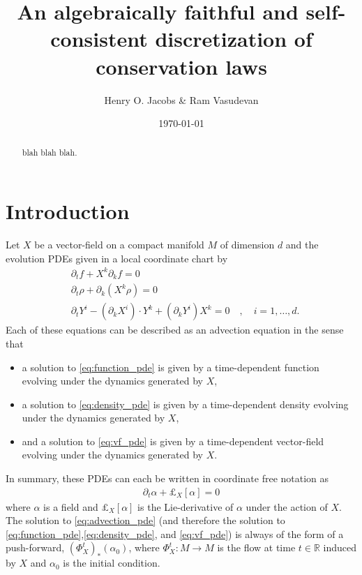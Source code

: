 \documentclass[12pt]{amsart}
\title{An algebraically faithful and self-consistent discretization of conservation laws}
\author{Henry O. Jacobs \& Ram Vasudevan}
\date{\today}
\newcommand{\R}{\ensuremath{\mathbb{R}}}
\begin{document}
\maketitle

\begin{abstract}
  blah blah blah.
\end{abstract}

\section{Introduction}
\label{sec:PDEs}
Let $X$ be a vector-field on a compact manifold $M$ of dimension $d$
and the evolution PDEs given in a local coordinate chart by
\begin{align}
	&\partial_t f + X^k \partial_k f= 0 \label{eq:function_pde} \\
	&\partial_t \rho + \partial_k( X^k \rho) = 0  \label{eq:density_pde} \\
	&\partial_t Y^i - (\partial_k X^i) \cdot Y^k + (\partial_k Y^i) X^k  = 0 \quad , \quad i = 1,\dots,d \label{eq:vf_pde}.
\end{align}
Each of these equations can be described as an advection equation in the sense that
\begin{itemize}
	\item a solution to \eqref{eq:function_pde} is given by a time-dependent function evolving under the dynamics generated by $X$,
	\item a solution to \eqref{eq:density_pde} is given by a time-dependent density evolving under the dynamics generated by $X$,
	\item and a solution to \eqref{eq:vf_pde} is given by a time-dependent vector-field evolving under the dynamics generated by $X$.
\end{itemize}
In summary, these PDEs can each be written in coordinate free notation as
\begin{align}
	\partial_t \alpha + \pounds_{X}[\alpha] = 0 \label{eq:advection_pde}
\end{align}
where $\alpha$ is a field and $\pounds_X[\alpha]$ is the Lie-derivative of $\alpha$ under the action of $X$.
The solution to \eqref{eq:advection_pde} (and therefore the solution to \eqref{eq:function_pde},\eqref{eq:density_pde}, and \eqref{eq:vf_pde}) is always of the form of a push-forward, $(\Phi_{X}^t)_* (\alpha_0)$, where $\Phi_{X}^t : M \to M$ is the flow at time $t \in \R$ induced by $X$ and $\alpha_0$ is the initial condition.
\end{document}
